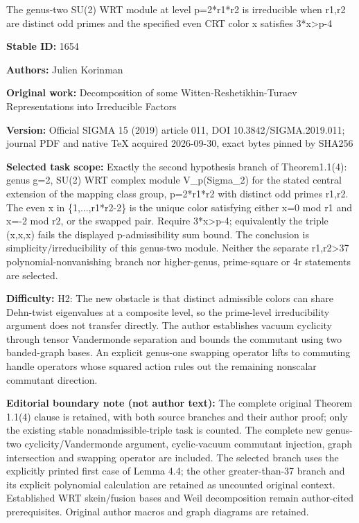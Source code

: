 \documentclass[11pt]{article}
\numberwithin{equation}{section}
\begin{document}
\begin{center}\Large The genus-two SU(2) WRT module at level p=2*r1*r2 is irreducible when r1,r2 are distinct odd primes and the specified even CRT color x satisfies 3*x>p-4\end{center}
\noindent\textbf{Stable ID:} 1654\par
\noindent\textbf{Authors:} Julien Korinman\par
\noindent\textbf{Original work:} Decomposition of some Witten-Reshetikhin-Turaev Representations into Irreducible Factors\par
\noindent\textbf{Version:} Official SIGMA 15 (2019) article 011, DOI 10.3842/SIGMA.2019.011; journal PDF and native TeX acquired 2026-09-30, exact bytes pinned by SHA256\par
\noindent\textbf{Selected task scope:} Exactly the second hypothesis branch of Theorem1.1(4): genus g=2, SU(2) WRT complex module V\_p(Sigma\_2) for the stated central extension of the mapping class group, p=2*r1*r2 with distinct odd primes r1,r2. The even x in \{1,...,r1*r2-2\} is the unique color satisfying either x=0 mod r1 and x=-2 mod r2, or the swapped pair. Require 3*x>p-4; equivalently the triple (x,x,x) fails the displayed p-admissibility sum bound. The conclusion is simplicity/irreducibility of this genus-two module. Neither the separate r1,r2>37 polynomial-nonvanishing branch nor higher-genus, prime-square or 4r statements are selected.\par
\noindent\textbf{Difficulty:} H2: The new obstacle is that distinct admissible colors can share Dehn-twist eigenvalues at a composite level, so the prime-level irreducibility argument does not transfer directly. The author establishes vacuum cyclicity through tensor Vandermonde separation and bounds the commutant using two banded-graph bases. An explicit genus-one swapping operator lifts to commuting handle operators whose squared action rules out the remaining nonscalar commutant direction.\par
\noindent\textbf{Editorial boundary note (not author text):} The complete original Theorem 1.1(4) clause is retained, with both source branches and their author proof; only the existing stable nonadmissible-triple task is counted. The complete new genus-two cyclicity/Vandermonde argument, cyclic-vacuum commutant injection, graph intersection and swapping operator are included. The selected branch uses the explicitly printed first case of Lemma 4.4; the other greater-than-37 branch and its explicit polynomial calculation are retained as uncounted original context. Established WRT skein/fusion bases and Weil decomposition remain author-cited prerequisites. Original author macros and graph diagrams are retained.\par
\end{document}
